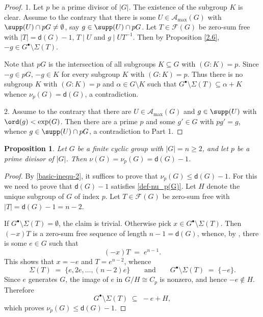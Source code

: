 \documentclass[a4paper, 10pt]{amsart}
\theoremstyle{plain}
\newtheorem{proposition}[theorem]{\bf Proposition}
\theoremstyle{definition}
\numberwithin{equation}{section}
\begin{document}
\begin{proof}
1. Let $p$ be a prime divisor of $|G|$. The existence of the subgroup $K$ is clear.  Assume to the contrary that there is some  $U\in \mathcal A_{\max} (G)$ with $\supp (U) \cap pG \ne \emptyset$,  say $g \in \supp (U) \cap pG$. Let $T \in \mathcal F (G)$ be zero-sum free with $|T| = \mathsf d (G)-1$, $T \mid U$ and $g\mid UT^{-1}$.
Then by Proposition \ref{2.6}, $-g\in G^{\bullet}\setminus \Sigma (T)$. 
	
Note that $pG$ is the intersection of all subgroups $K \subseteq G$ with $(G : K)=p$. Since $-g\in pG$, $-g\in K$ for every subgroup $K$ with  $ (G:K)=p$. Thus there is no subgroup $K$ with  $ (G:K)=p$ and $\alpha \in G\setminus K$ such that $G^{\bullet}\setminus \Sigma (T)\subseteq \alpha +K$ whence $\nu_p (G) = \mathsf d (G)$, a contradiction.

2. Assume to the contrary that there are  $U \in \mathcal A_{\max} (G)$ and  $g \in \supp (U)$ with $\ord (g) < \exp (G)$. Then there are a prime $p$ and some $g' \in G$ with $pg' = g$, whence $g \in \supp (U) \cap pG$, a contradiction to Part 1.
\end{proof}


\begin{proposition} \label{3.3}
Let $G$ be a finite cyclic group with $|G| = n \ge 2$, and let $p$ be a prime divisor of $|G|$. Then $\nu (G) = \nu _p (G) = \mathsf d (G)-1$.
\end{proposition}

\begin{proof}
By \eqref{basic-inequ-2}, it suffices  to prove that $\nu_p (G) \le \mathsf{d}(G) - 1$. For this we need to prove that $\mathsf d (G)-1$ satisfies \eqref{def-nu_p(G)}.
Let $H$ denote the unique subgroup of $G$
	of index $p$. Let $T \in \mathcal{F}(G)$ be zero-sum free with
	$|T| = \mathsf{d}(G) - 1 = n - 2$.
	
	If $G^\bullet \setminus \Sigma(T) = \emptyset$, the claim is trivial. Otherwise
	pick $x \in G^\bullet \setminus \Sigma(T)$. Then $(-x) T$ is a zero-sum free
	sequence of length $n - 1 = \mathsf{d}(G)$, whence, by 
	\cite[Theorem~5.1.10]{Ge-HK06a}, there is some   $e \in G$ such that
	\[
	(-x) T \;=\; e^{n-1}.
	\]
This shows that  $x = -e$ and $T = e^{n-2}$, whence
	\[
	\Sigma(T) \;=\; \{e, 2e, \ldots, (n-2)e\}
	\qquad\text{and}\qquad
	G^\bullet \setminus \Sigma(T) \;=\; \{-e\}.
	\]
	Since $e$ generates $G$, the image of $e$ in $G/H \cong C_p$ is nonzero, and
	hence $-e \notin H$. Therefore
	\[
	G^\bullet \setminus \Sigma(T) \;\subseteq\; -e + H,
	\]
	which proves $\nu_p (G) \le \mathsf{d}(G) - 1$.
\end{proof}
\end{document}
